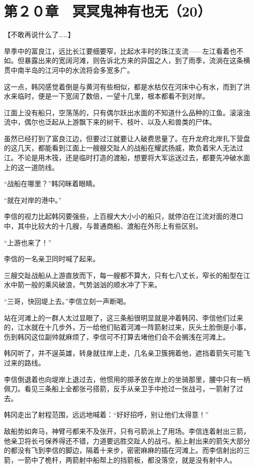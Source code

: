 \section{第２０章　冥冥鬼神有也无（20）}

【不敢再说什么了……】

旱季中的富良江，远比长江要细要窄，比起水丰时的珠江支流——左江看着也不如。但暴露出来的宽阔河滩，则告诉北方来的异国之人，到了雨季，流淌在这条横贯中南半岛的江河中的水流将会多宽多广。

这一点，韩冈感觉着倒是与黄河有些相似，都是水枯仅在河床中心有水，而到了洪水来临时，便是一下宽阔了数倍，一望十几里，根本都看不到对岸。

江面上没有船只，空荡荡的，只有偶尔跃出水面的不知道什么品种的江鱼。滚滚浊流中，偶尔也泛起从上游飘下来的树干、枝叶、以及人和兽类的尸体。

虽然已经打到了富良江边，但要过江就要让人破费思量了。在升龙府北岸扎下营盘的这几天，都能看到江面上一艘艘交趾人的战船在耀武扬威，欺负着宋人无法过江。不论是用木筏，还是临时打造的渡船，想要将大军运送过去，都要先冲破水面上的这一道防线。

“战船在哪里？”韩冈眯着眼睛。

“就在对岸的港中。”

李信的视力比起韩冈要强些，上百艘大大小小的船只，就停泊在江流对面的港口中，其中比较大的十几艘，与普通商船、渡船在外形上有些区别。

“上游也来了！”

李信的一名亲卫同时喊了起来。

三艘交趾战船从上游直放而下，每一艘都不算大，只有七八丈长，窄长的船型在江水中箭一般的乘风破浪，气势汹汹的顺水冲了下来。

“三哥，快回堤上去。”李信立刻一声断喝。

站在河滩上的一群人太过显眼了，这三条船很明显就是冲着韩冈、李信他们过来的，江水就在十几步外，万一给他们贴着河滩一阵箭射过来，灰头土脸倒是小事，伤到韩冈这位副帅就麻烦了，李信可不打算去堵他们会不会搁浅在河滩上。

韩冈听了，并不逞英雄，转身就往岸上走，几名亲卫簇拥着他，遮挡着箭矢可能飞过来的路线。

李信倒退着也向堤岸上退过去，他惯用的掷矛放在岸上的坐骑那里，腰中只有一柄佩刀。看见三条船上全都张弓搭箭，反手从亲卫手中抢过一张战弓，一箭射了过去。

韩冈走出了射程范围，远远地喊着：“好好招呼，别让他们太得意！”

敌船势如奔马，神臂弓都来不及张开，只有弓箭派上了用场。李信连着射出三箭，他亲卫将长弓保养得还不错，力道要远胜交趾人的战弓。船上射出来的箭矢大部分的都没有飞到李信的脚边，隔着十来步，密密麻麻的插在河滩上。而李信射出的三箭，一箭中了桅杆，两箭射中船帮上的挡箭板，都没落空，就是没有射中人。

